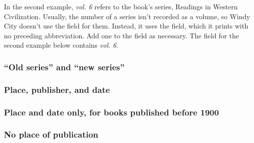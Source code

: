 \documentclass[11pt,letterpaper,oneside]{article}
\begin{document}
In the second example, \textit{vol. 6} refers to the book's series,
Readings in Western Civilization. Usually, the number of a series
isn't recorded as a volume, so Windy City doesn't use the
 field for them. Instead, it uses the
 field, which it prints with no preceding
abbreviation. Add one to the field as necessary. The 
field for the second example below contains \textit{vol. 6}.

\begin{citebib}
\item \cite{boyer1986}
\item \cite{cochrane1987}
\end{citebib}

\setcounter{subsubsection}{125}
\subsubsection{``Old series'' and ``new series''}
\label{14.126}

\begin{citebib}
\item \cite{boxer1953}
\item \cite{palmatary1950}
\end{citebib}

\subsubsection{Place, publisher, and date}

\begin{citebib}
\item \cite{woolf1927}
\end{citebib}

\subsubsection{Place and date only, for books published before 1900}

\begin{citebib}
\item \cite{goldsmith1766}
\item \cite{cervantes1605}
\end{citebib}

\setcounter{subsubsection}{131}
\subsubsection{No place of publication}
\end{document}
